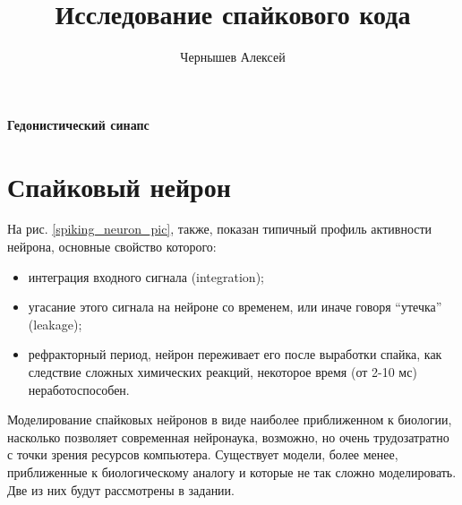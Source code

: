 \documentclass[a4paper,10pt,usenames]{article}
\title{Исследование спайкового кода}
\author{Чернышев Алексей}
\begin{document}
{ \huge \bfseries Гедонистический синапс\\[0.4cm] }


\tableofcontents
\clearpage
\section{Спайковый нейрон}
\indent На рис. \ref{spiking_neuron_pic}, также, показан типичный профиль активности нейрона, основные свойство которого: 
\begin{itemize}
\item интеграция входного сигнала (integration);
\item угасание этого сигнала на нейроне со временем, или иначе говоря ``утечка'' (leakage);
\item рефракторный период, нейрон переживает его после выработки спайка, как следствие сложных химических реакций, некоторое время (от 2-10 мс) неработоспособен.
\end{itemize}
\indent Моделирование спайковых нейронов в виде наиболее приближенном к биологии, насколько позволяет современная нейронаука, возможно, но очень трудозатратно с точки зрения ресурсов компьютера. Существует модели, более менее, приближенные к биологическому аналогу и которые не так сложно моделировать. Две из них будут рассмотрены в задании.
\end{document}

